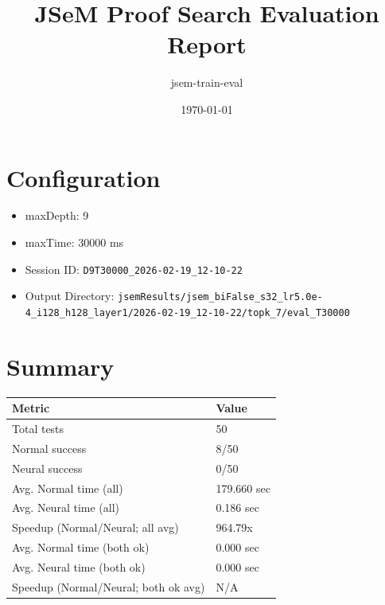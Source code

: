 \documentclass[a4paper,10pt]{article}
\title{JSeM Proof Search Evaluation Report}
\author{jsem-train-eval}
\date{\today}
\begin{document}
\maketitle

\section{Configuration}
\begin{itemize}
\item maxDepth: 9
\item maxTime: 30000 ms
\item Session ID: \texttt{D9T30000\_2026-02-19\_12-10-22}
\item Output Directory: \texttt{jsemResults/jsem\_biFalse\_s32\_lr5.0e-4\_i128\_h128\_layer1/2026-02-19\_12-10-22/topk\_7/eval\_T30000}
\end{itemize}

\section{Summary}
\begin{tabular}{ll}
\toprule
\textbf{Metric} & \textbf{Value} \\
\midrule
Total tests & 50 \\
Normal success & 8/50 \\
Neural success & 0/50 \\
\midrule
Avg. Normal time (all) & 179.660 sec \\
Avg. Neural time (all) & 0.186 sec \\
Speedup (Normal/Neural; all avg) & 964.79x \\
Avg. Normal time (both ok) & 0.000 sec \\
Avg. Neural time (both ok) & 0.000 sec \\
Speedup (Normal/Neural; both ok avg) & N/A \\
\bottomrule
\end{tabular}
\end{document}
